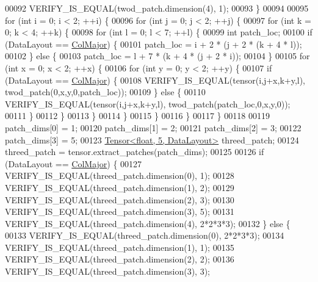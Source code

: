 \begin{DoxyCode}
00092     VERIFY\_IS\_EQUAL(twod\_patch.dimension(4), 1);
00093   \}
00094 
00095   \textcolor{keywordflow}{for} (\textcolor{keywordtype}{int} i = 0; i < 2; ++i) \{
00096     \textcolor{keywordflow}{for} (\textcolor{keywordtype}{int} j = 0; j < 2; ++j) \{
00097       \textcolor{keywordflow}{for} (\textcolor{keywordtype}{int} k = 0; k < 4; ++k) \{
00098         \textcolor{keywordflow}{for} (\textcolor{keywordtype}{int} l = 0; l < 7; ++l) \{
00099           \textcolor{keywordtype}{int} patch\_loc;
00100           \textcolor{keywordflow}{if} (DataLayout == \hyperlink{group__enums_ggaacded1a18ae58b0f554751f6cdf9eb13a0cbd4bdd0abcfc0224c5fcb5e4f6669a}{ColMajor}) \{
00101             patch\_loc = i + 2 * (j + 2 * (k + 4 * l));
00102           \} \textcolor{keywordflow}{else} \{
00103             patch\_loc = l + 7 * (k + 4 * (j + 2 * i));
00104           \}
00105           \textcolor{keywordflow}{for} (\textcolor{keywordtype}{int} x = 0; x < 2; ++x) \{
00106             \textcolor{keywordflow}{for} (\textcolor{keywordtype}{int} y = 0; y < 2; ++y) \{
00107               \textcolor{keywordflow}{if} (DataLayout == \hyperlink{group__enums_ggaacded1a18ae58b0f554751f6cdf9eb13a0cbd4bdd0abcfc0224c5fcb5e4f6669a}{ColMajor}) \{
00108                 VERIFY\_IS\_EQUAL(tensor(i,j+x,k+y,l), twod\_patch(0,x,y,0,patch\_loc));
00109               \} \textcolor{keywordflow}{else} \{
00110                 VERIFY\_IS\_EQUAL(tensor(i,j+x,k+y,l), twod\_patch(patch\_loc,0,x,y,0));
00111               \}
00112             \}
00113           \}
00114         \}
00115       \}
00116     \}
00117   \}
00118 
00119   patch\_dims[0] = 1;
00120   patch\_dims[1] = 2;
00121   patch\_dims[2] = 3;
00122   patch\_dims[3] = 5;
00123   \hyperlink{class_eigen_1_1_tensor}{Tensor<float, 5, DataLayout>} threed\_patch;
00124   threed\_patch = tensor.extract\_patches(patch\_dims);
00125 
00126   \textcolor{keywordflow}{if} (DataLayout == \hyperlink{group__enums_ggaacded1a18ae58b0f554751f6cdf9eb13a0cbd4bdd0abcfc0224c5fcb5e4f6669a}{ColMajor}) \{
00127     VERIFY\_IS\_EQUAL(threed\_patch.dimension(0), 1);
00128     VERIFY\_IS\_EQUAL(threed\_patch.dimension(1), 2);
00129     VERIFY\_IS\_EQUAL(threed\_patch.dimension(2), 3);
00130     VERIFY\_IS\_EQUAL(threed\_patch.dimension(3), 5);
00131     VERIFY\_IS\_EQUAL(threed\_patch.dimension(4), 2*2*3*3);
00132   \} \textcolor{keywordflow}{else} \{
00133     VERIFY\_IS\_EQUAL(threed\_patch.dimension(0), 2*2*3*3);
00134     VERIFY\_IS\_EQUAL(threed\_patch.dimension(1), 1);
00135     VERIFY\_IS\_EQUAL(threed\_patch.dimension(2), 2);
00136     VERIFY\_IS\_EQUAL(threed\_patch.dimension(3), 3);

\end{DoxyCode}
